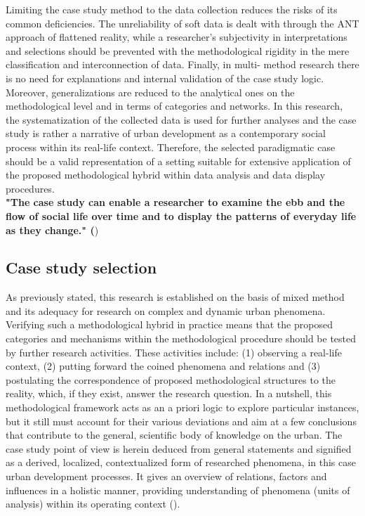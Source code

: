 \documentclass[11pt]{report}
\begin{document}
{{{{Limiting the case study method to the data collection reduces the risks of its common deficiencies. The unreliability of soft data is dealt with through the ANT approach of flattened reality, while a researcher’s subjectivity in interpretations and selections should be prevented with the methodological rigidity in the mere classification and interconnection of data. Finally, in multi- method research there is no need for explanations and internal validation of the case study logic. Moreover, generalizations are reduced to the analytical ones on the methodological level and in terms of categories and networks. In this research, the systematization of the collected data is used for further analyses and the case study is rather a narrative of urban development as a contemporary social process within its real-life context. Therefore, the selected paradigmatic case should be a valid representation of a setting suitable for extensive application of the proposed methodological hybrid within data analysis and data display procedures.
\\

\textbf{"The case study can enable a researcher to examine the ebb and the flow of social life over time and to display the patterns of everyday life as they change." (\href{Feagin}{\citealt{feagin_case_1991}}})

\subsection{Case study selection}

As previously stated, this research is established on the basis of mixed method and its adequacy for research on complex and dynamic urban phenomena. Verifying such a methodological hybrid in practice means that the proposed categories and mechanisms within the methodological procedure should be tested by further research activities. These activities include: (1) observing a real-life context, (2) putting forward the coined phenomena and relations and (3) postulating the correspondence of proposed methodological structures to the reality, which, if they exist, answer the research question. In a nutshell, this methodological framework acts as an a priori logic to explore particular instances, but it still must account for their various deviations and aim at a few conclusions that contribute to the general, scientific body of knowledge on the urban. The case study point of view is herein deduced from general statements and signified as a derived, localized, contextualized form of researched phenomena, in this case urban development processes. It gives an overview of relations, factors and influences in a holistic manner, providing understanding of phenomena (units of analysis) within its operating context  (\href{Harrison}{\citealt{partington_case_2002}}).
\\

}}}}
\end{document}
